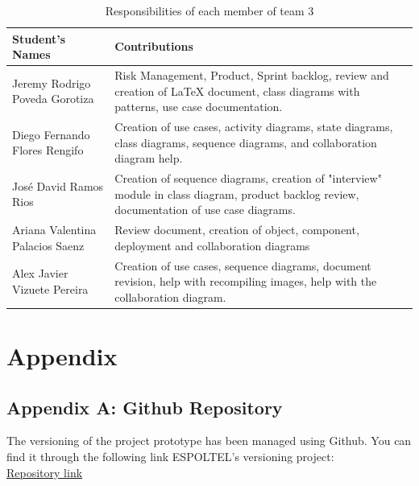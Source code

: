 \documentclass{scrreprt}
\begin{document}
\begin{table}[h!]
    \centering \small
    \renewcommand{\arraystretch}{1.5} 
    \begin{tabular}{|p{5cm}|p{10cm}|} 
    \hline
    \textbf{Student's Names} & \textbf{Contributions} \\ \hline
    Jeremy Rodrigo Poveda Gorotiza & Risk Management, Product, Sprint backlog, review and creation of LaTeX document, class diagrams with patterns, use case documentation. \\ \hline
    Diego Fernando Flores Rengifo & Creation of use cases, activity diagrams, state diagrams, class diagrams, sequence diagrams, and collaboration diagram help. \\ \hline
    José David Ramos Rios & Creation of sequence diagrams, creation of "interview" module in class diagram, product backlog review, documentation of use case diagrams. \\ \hline
    Ariana Valentina Palacios Saenz & Review document, creation of object, component, deployment and collaboration diagrams\\ \hline
    Alex Javier Vizuete Pereira & Creation of use cases, sequence diagrams, document revision, help with recompiling images, help with the collaboration diagram.\\ \hline
    \end{tabular}
    \caption{Responsibilities of each member of team 3}
\end{table} \FloatBarrier 



\chapter{Appendix}

\section{Appendix A: Github Repository}
The versioning of the project prototype has been managed using Github. You can find it through the following link ESPOLTEL's versioning project:\\ \href{https://github.com/Jeremy-Poveda/EspoltelHiringManager}{Repository link}
\end{document}

